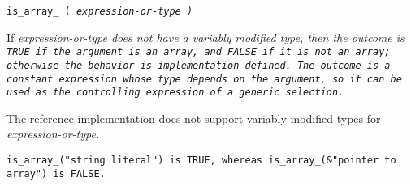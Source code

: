 
\tt{is_array_ (} \it{expression-or-type} \tt{)}


If \it{expression-or-type} does not have a variably modified type,
then the outcome is \tt{TRUE} if the argument is an array, and \tt{FALSE}
if it is not an array; otherwise the behavior is implementation-defined.
The outcome is a constant expression whose type depends on the argument,
so it can be used as the controlling expression of a generic selection.

\note The reference implementation does not support
variably modified types for \it{expression-or-type}.

\example \tt{is_array_("string literal")} is \tt{TRUE},
 whereas \tt{is_array_(&"pointer to array")} is \tt{FALSE}.
